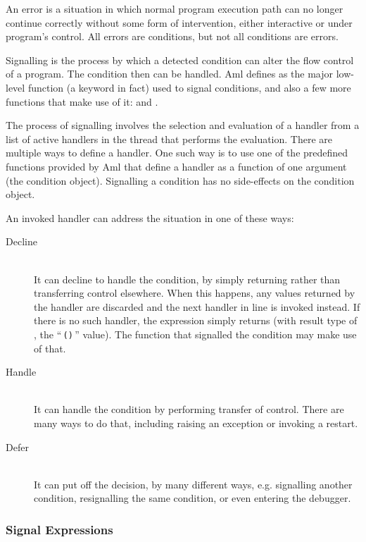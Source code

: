 An error is a situation in which normal program execution path can no longer continue correctly without some form of intervention, either interactive or under program's control. All errors are conditions, but not all conditions are errors. 

Signalling is the process by which a detected condition can alter the flow control of a program. The condition then can be handled. Aml defines  as the major low-level function (a keyword in fact) used to signal conditions, and also a few more functions that make use of it:  and . 

The process of signalling involves the selection and evaluation of a handler from a list of active handlers in the thread that performs the evaluation. There are multiple ways to define a handler. One such way is to use one of the predefined functions provided by Aml that define a handler as a function of one argument (the condition object). Signalling a condition has no side-effects on the condition object. 

An invoked handler can address the situation in one of these ways: 
\begin{description}
  \item[Decline] \hfill \\
    It can decline to handle the condition, by simply returning rather than transferring control elsewhere. When this happens, any values returned by the handler are discarded and the next handler in line is invoked instead. If there is no such handler, the  expression simply returns (with result type of , the ``\,\lstinline!()!\,'' value). The function that signalled the condition may make use of that. 
  \item[Handle] \hfill \\
    It can handle the condition by performing transfer of control. There are many ways to do that, including raising an exception or invoking a restart. 
  \item[Defer] \hfill \\
    It can put off the decision, by many different ways, e.g. signalling another condition, resignalling the same condition, or even entering the debugger. 
\end{description}





\subsubsection{Signal Expressions}
\label{sec:signal-expressions}

